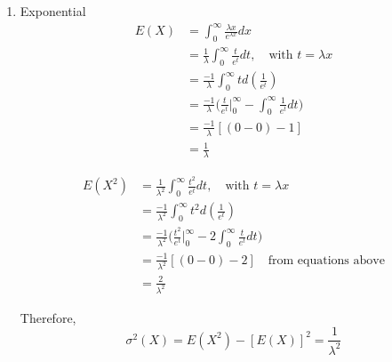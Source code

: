 \documentclass[UTF8]{article}
\begin{document}
    \begin{enumerate}
        \item Exponential
        \begin{equation*}
          \begin{split}
             E(X) & = \int_{0}^{\infty}\frac{\lambda x}{e^{\lambda x}}dx\\
               & = \frac{1}{\lambda}\int_{0}^{\infty}\frac{t}{e^t}dt,\quad\text{with $t=\lambda x$}\\
               &=\frac{-1}{\lambda}\int_{0}^{\infty}td(\frac{1}{e^t})\\
               & =\frac{-1}{\lambda}\bigg(\frac{t}{e^t}\bigg|^\infty_0-\int_{0}^{\infty}\frac{1}{e^t}dt\bigg)\\
               &=\frac{-1}{\lambda}[(0-0)-1]\\
               &=\frac{1}{\lambda}
          \end{split}
        \end{equation*}

        \begin{equation*}
          \begin{split}
             E(X^2) &=\frac{1}{\lambda^2}\int_{0}^{\infty}\frac{t^2}{e^t}dt,\quad\text{with $t=\lambda x$}\\
               &=\frac{-1}{\lambda^2}\int_{0}^{\infty}t^2d(\frac{1}{e^t})\\
               &=\frac{-1}{\lambda^2}\bigg(\frac{t^2}{e^t}\bigg|^\infty_0-2\int_{0}^{\infty}\frac{t}{e^t}dt\bigg)\\
               &=\frac{-1}{\lambda^2}[(0-0)-2]\quad\text{from equations above}\\
               &=\frac{2}{\lambda^2}
          \end{split}
        \end{equation*}

        Therefore, 
        \begin{equation*}
            \sigma^2(X)= E(X^2)-[E(X)]^2=\frac{1}{\lambda^2}
        \end{equation*}


\end{enumerate}
\end{document}

